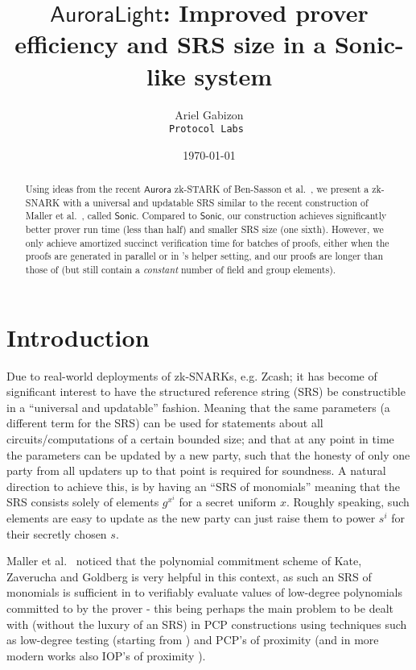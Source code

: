 \documentclass[11pt]{article}
\title{%
$\mathsf{AuroraLight}$: Improved prover efficiency and SRS size in a Sonic-like system}
\date{\today}
\author{Ariel Gabizon\\ \tt{Protocol Labs} }
\date{}
\numberwithin{figure}{section} %
\newcommand{\sonic}{\ensuremath{\mathsf{Sonic}}\xspace}
\newcommand{\aurora}{\ensuremath{\mathsf{Aurora}}\xspace}
\begin{document}
\maketitle

\begin{abstract}
Using ideas from the recent \aurora zk-STARK of Ben-Sasson et al.\ \cite{aurora}, we present a zk-SNARK with a universal and updatable SRS similar to the recent construction of Maller et al.\ \cite{sonic}, called \sonic.
Compared to \sonic, our construction achieves significantly better prover run time (less than half) and smaller SRS size (one sixth). However, we only achieve amortized succinct verification time for batches of proofs, either when the proofs are generated in parallel or in \cite{sonic}'s helper setting, and our proofs are longer than those of \cite{sonic} (but still contain a \emph{constant} number of field and group elements).
\end{abstract}


\section{Introduction}
Due to real-world deployments of zk-SNARKs, e.g. Zcash; it has become of significant interest to have the structured reference string (SRS) be constructible in a ``universal and updatable'' fashion. Meaning that the same parameters (a different term for the SRS) can be used for statements about all circuits/computations of a certain bounded size; and that at any point in time the parameters can be updated by a new party, such that the honesty of only one party from all updaters up to that point is required for soundness.
A natural direction to achieve this, is by having an ``SRS of monomials'' meaning that the SRS consists solely of elements ${g^{x^i}}$ for a secret uniform $x$. Roughly speaking, such elements are easy to update as the new party can just raise them to power $s^i$ for their secretly chosen $s$.

Maller et al.\ \cite{sonic} noticed that the polynomial commitment scheme of Kate, Zaverucha and Goldberg \cite{kate} is very helpful in this context, as such an SRS of monomials is sufficient in \cite{kate} to verifiably evaluate values of low-degree polynomials committed to by the prover - this being perhaps the main problem to be dealt with (without the luxury of an SRS) in PCP constructions using techniques such as low-degree testing (starting from \cite{BFL}) and PCP's of proximity \cite{BSS} (and in more modern works also IOP's of proximity \cite{BCGRS}).
\end{document}
